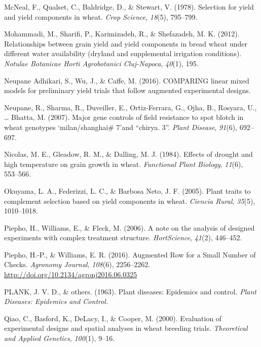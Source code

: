 \documentclass[12pt,oneside]{dukestatscithesis} %
\theoremstyle{definition}
\theoremstyle{definition}
\theoremstyle{definition}
\theoremstyle{remark}
\begin{document}
\hypertarget{ref-mcneal1978selection}{}
McNeal, F., Qualset, C., Baldridge, D., \& Stewart, V. (1978). Selection
for yield and yield components in wheat. \emph{Crop Science},
\emph{18}(5), 795--799.

\hypertarget{ref-mohammadi2012relationships}{}
Mohammadi, M., Sharifi, P., Karimizadeh, R., \& Shefazadeh, M. K.
(2012). Relationships between grain yield and yield components in bread
wheat under different water availability (dryland and supplemental
irrigation conditions). \emph{Notulae Botanicae Horti Agrobotanici
Cluj-Napoca}, \emph{40}(1), 195.

\hypertarget{ref-neupane2016comparing}{}
Neupane Adhikari, S., Wu, J., \& Caffe, M. (2016). COMPARING linear
mixed models for preliminary yield trials that follow augmented
experimental designs.

\hypertarget{ref-neupane2007major}{}
Neupane, R., Sharma, R., Duveiller, E., Ortiz-Ferrara, G., Ojha, B.,
Rosyara, U., \ldots{} Bhatta, M. (2007). Major gene controls of field
resistance to spot blotch in wheat genotypes `milan/shanghai\# 7'and
``chirya. 3''. \emph{Plant Disease}, \emph{91}(6), 692--697.

\hypertarget{ref-nicolas1984effects}{}
Nicolas, M. E., Gleadow, R. M., \& Dalling, M. J. (1984). Effects of
drought and high temperature on grain growth in wheat. \emph{Functional
Plant Biology}, \emph{11}(6), 553--566.

\hypertarget{ref-okuyama2005plant}{}
Okuyama, L. A., Federizzi, L. C., \& Barbosa Neto, J. F. (2005). Plant
traits to complement selection based on yield components in wheat.
\emph{Ciencia Rural}, \emph{35}(5), 1010--1018.

\hypertarget{ref-piepho2006note}{}
Piepho, H., Williams, E., \& Fleck, M. (2006). A note on the analysis of
designed experiments with complex treatment structure.
\emph{HortScience}, \emph{41}(2), 446--452.

\hypertarget{ref-piepho_augmented_2016}{}
Piepho, H.-P., \& Williams, E. R. (2016). Augmented Row for a Small
Number of Checks. \emph{Agronomy Journal}, \emph{108}(6), 2256--2262.
\url{http://doi.org/10.2134/agronj2016.06.0325}

\hypertarget{ref-plank1963plant}{}
PLANK, J. V. D., \& others. (1963). Plant diseases: Epidemics and
control. \emph{Plant Diseases: Epidemics and Control.}

\hypertarget{ref-qiao2000evaluation}{}
Qiao, C., Basford, K., DeLacy, I., \& Cooper, M. (2000). Evaluation of
experimental designs and spatial analyses in wheat breeding trials.
\emph{Theoretical and Applied Genetics}, \emph{100}(1), 9--16.
\end{document}
